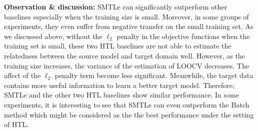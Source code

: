 \textbf{Observation \& discussion:} SMTLe can significantly outperform other baselines especially when the training size is small. Moreover, in some groups of experiments, they even suffer from negative transfer on the small training set. As we discussed above, without the $\ell_2$ penalty in the objective functions when the training set is small, these two HTL baselines are not able to estimate the relatedness between the source model and target domain well. However, as the training size increases, the variance of the estimation of LOOCV decreases. The affect of the $\ell_2$ penalty term become less significant. Meanwhile, the target data contains more useful information to learn a better target model. Therefore, SMTLe and the other two HTL baselines show similar performance. In some experiments, it is interesting to see that SMTLe can even outperform the Batch method which might be considered as the the best performance under the setting of HTL.



